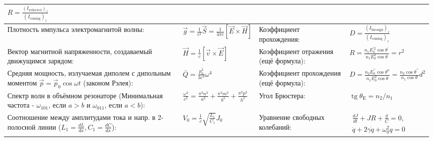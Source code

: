 \documentclass{article}
\begin{document}
\begin{tabular}{ |p{5cm}|p{4.5cm}|p{6cm}|p{3.5cm}|  }
$R=\frac{\left(I_{\mathrm{reflected}}\right)_{z}}{\left(I_{\mathrm{coming}}\right)_{z}}$\\
\hline
Плотность импульса электромагнитой волны: &
$\vec{g}=\frac{1}{c^{2}} \vec{S}=\frac{1}{4 \pi c} [\vec{E} \times \vec{H}]$&
Коэффициент прохождения: &
$D=\frac{\left(I_{\text {through}}\right)_{z}}{\left(I_{\text {coming}}\right)_{z}}$ \\
\hline
Вектор магнитной напряженности, создаваемый движущимся зарядом:&
$\vec{H}=\frac{1}{c} [\vec{v} \times \vec{E}]$&
Коэффициент отражения (ещё формула): &
$R=\frac{n_{1} E_{0}^{\prime 2} \cos \theta^{\prime}}{n_{1} E_{0}^{2} \cos \theta}=r^{2}$\\
\hline
Средняя мощность, излучаемая диполем с дипольным моментом $\vec{p}=\vec{p}_{0} \cos \omega t$ (законом Рэлея):&
$\bar{Q}=\frac{p_{0}^{2}}{3 c^{3}} \omega^{4}$&
Коэффициент прохождения (ещё формула): &
$D=\frac{n_{2} E_{0}^{\prime \prime} \cos \theta^{n}}{n_{1} E_{0}^{2} \cos \theta}=\frac{n_{2} \cos \theta^{\prime \prime}}{n_{1} \cos \theta} d^{2}$\\
\hline
Спектр волн в объёмном резонаторе (Минимальная частота - $\omega_{101}$, если $a > b$ и $\omega_{011}$, если $a < b$): &
$\frac{\omega^{2}}{c^{2}}=\frac{\pi^{2} n^{2}}{a^{2}}+\frac{\pi^{2} m^{2}}{b^{2}}+\frac{\pi^{2} p^{2}}{h^{2}}$ &
Угол Брюстера: &
$\operatorname{tg} \theta_{\mathrm{E}}=n_{2} / n_{1}$ \\
\hline
Соотношение между амплитудами тока и напр. в 2-полосной линии ($L_1 = \frac{d{L}}{d{x}}, C_1 = \frac{d{C}}{d{x}}$): &
$V_{0}=\frac{1}{c} \sqrt{\frac{L_{1}}{C_{1}}} J_{0}$&
Уравнение свободных колебаний: &
$\begin{aligned}
 \frac{d J}{d t}+J R+\frac{q}{C}=0, \\ 
\ddot{q}+2 \gamma \dot{q}+\omega_{0}^{2} q=0
\end{aligned}$ \\
\hline
\end{tabular}

\newpage
\end{document}
